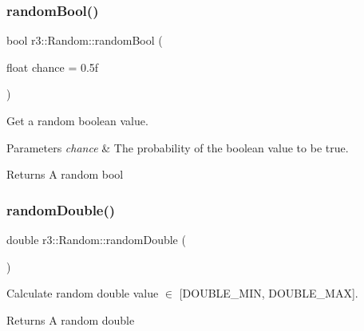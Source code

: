 \subsubsection{\texorpdfstring{random\+Bool()}{randomBool()}}
{\footnotesize\ttfamily bool r3\+::\+Random\+::random\+Bool (\begin{DoxyParamCaption}\item[{float}]{chance = {\ttfamily 0.5f} }\end{DoxyParamCaption})\hspace{0.3cm}{\ttfamily [static]}}



Get a random boolean value. 


\begin{DoxyParams}{Parameters}
{\em chance} & The probability of the boolean value to be true. \\
\hline
\end{DoxyParams}
\begin{DoxyReturn}{Returns}
A random bool 
\end{DoxyReturn}
\mbox{\label{classr3_1_1_random_a69d200d316daad8cfa6efdd1196a2c38}} 
\subsubsection{\texorpdfstring{random\+Double()}{randomDouble()}\hspace{0.1cm}{\footnotesize\ttfamily [1/2]}}
{\footnotesize\ttfamily double r3\+::\+Random\+::random\+Double (\begin{DoxyParamCaption}{ }\end{DoxyParamCaption})\hspace{0.3cm}{\ttfamily [static]}}



Calculate random double value $\in$ \mbox{[}D\+O\+U\+B\+L\+E\+\_\+\+M\+IN, D\+O\+U\+B\+L\+E\+\_\+\+M\+AX\mbox{]}. 

\begin{DoxyReturn}{Returns}
A random double 
\end{DoxyReturn}
\mbox{\label{classr3_1_1_random_a059b209f1eb1f46a8a9101ada359b028}} 
